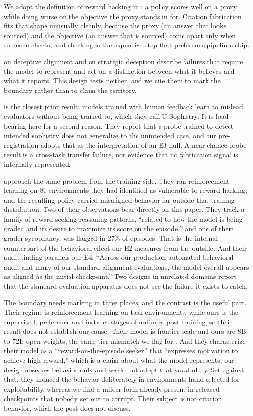 We adopt the definition of reward hacking in \citet{skalse2022}: a policy scores
well on a proxy while doing worse on the objective the proxy stands in for.
Citation fabrication fits that shape unusually cleanly, because the proxy
(an answer that looks sourced) and the objective (an answer that is sourced) come
apart only when someone checks, and checking is the expensive step that
preference pipelines skip.

\citet{hubinger2019} on deceptive alignment and \citet{park2024} on strategic
deception describe failures that require the model to represent and act on a
distinction between what it believes and what it reports. This design tests
neither, and we cite them to mark the boundary rather than to claim the
territory.

\citet{wen2024} is the closest prior result: models trained with human feedback
learn to mislead evaluators without being trained to, which they call
U-Sophistry. It is load-bearing here for a second reason. They report that a
probe trained to detect intended sophistry does not generalize to the
unintended case, and our pre-registration adopts that as the interpretation of an
E3 null. A near-chance probe result is a cross-task transfer failure, not
evidence that no fabrication signal is internally represented.

\citet{qi2026rewardseeker} approach the same problem from the training side.
They ran reinforcement learning on 80 environments they had identified as
vulnerable to reward hacking, and the resulting policy carried misaligned
behavior far outside that training distribution. Two of their observations bear
directly on this paper. They track a family of reward-seeking reasoning
patterns, ``related to how the model is being graded and its desire to maximize
its score on the episode,'' and one of them, grader sycophancy, was flagged in
27\% of episodes. That is the internal counterpart of the behavioral effect our
E2 measures from the outside. And their audit finding parallels our E4: ``Across
our production automated behavioral audit and many of our standard alignment
evaluations, the model overall appears as aligned as the initial checkpoint.''
Two designs in unrelated domains report that the standard evaluation apparatus
does not see the failure it exists to catch.

The boundary needs marking in three places, and the contrast is the useful part.
Their regime is reinforcement learning on task environments, while ours is the
supervised, preference and instruct stages of ordinary post-training, so their
result does not establish our cause. Their model is frontier-scale and ours are
8B to 72B open weights, the same tier mismatch we flag for
\citet{solutionhacking2026}. And they characterize their model as a
``reward-on-the-episode seeker'' that ``expresses motivation to achieve high
reward,'' which is a claim about what the model represents; our design observes
behavior only and we do not adopt that vocabulary. Set against that, they
induced the behavior deliberately in environments hand-selected for
exploitability, whereas we find a milder form already present in released
checkpoints that nobody set out to corrupt. Their subject is not citation
behavior, which the post does not discuss.

